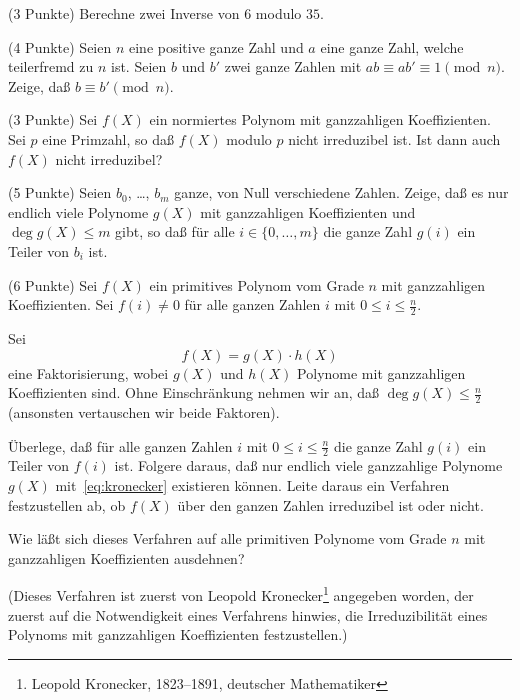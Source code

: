 \documentclass{algsheet}
\begin{document}
\begin{exercise}(3 Punkte)\newline
    Berechne zwei Inverse von \(6\) modulo \(35\).
\end{exercise}

\begin{exercise}(4 Punkte)\newline
    Seien \(n\) eine positive ganze Zahl
    und \(a\) eine ganze Zahl, welche teilerfremd zu
    \(n\) ist. Seien \(b\) und \(b'\) zwei ganze Zahlen mit
    \(a b \equiv a b' \equiv 1 \pmod n\). Zeige, daß
    \(b \equiv b'  \pmod n\).
\end{exercise}

\begin{exercise}(3 Punkte)\newline
    Sei \(f(X)\) ein normiertes Polynom mit ganzzahligen Koeffizienten.
    Sei \(p\) eine Primzahl, so daß \(f(X)\) modulo \(p\) nicht irreduzibel
    ist. Ist dann auch \(f(X)\) nicht irreduzibel?
\end{exercise}

\begin{exercise}(5 Punkte)\newline
    Seien \(b_0\), \dots, \(b_m\) ganze, von Null verschiedene Zahlen. Zeige, daß es nur endlich viele Polynome
    \(g(X)\) mit ganzzahligen Koeffizienten und \(\deg g(X) \leq m\) gibt, so daß für alle
    \(i \in \{0, \dots, m\}\) die ganze Zahl \(g(i)\) ein Teiler von \(b_i\) ist.
\end{exercise}

\begin{exercise}(6 Punkte)\newline
    Sei \(f(X)\) ein primitives Polynom vom Grade \(n\) mit ganzzahligen Koeffizienten. Sei
    \(f(i) \neq 0\) für alle ganzen Zahlen \(i\) mit \(0 \leq i \leq \frac n 2\).
    
    Sei
    \begin{equation}
        f(X) = g(X) \cdot h(X)
        \label{eq:kronecker}
    \end{equation}
    eine Faktorisierung, wobei \(g(X)\) und \(h(X)\) Polynome mit ganzzahligen Koeffizienten sind.
    Ohne Einschränkung nehmen
    wir an, daß \(\deg g(X) \leq \frac n 2\) (ansonsten vertauschen wir beide Faktoren).
    
    Überlege, daß für alle ganzen Zahlen \(i\) mit \(0 \leq i \leq \frac n 2\) die ganze Zahl \(g(i)\)
    ein Teiler von \(f(i)\) ist. Folgere daraus, daß nur endlich viele ganzzahlige Polynome \(g(X)\)
    mit~\eqref{eq:kronecker} existieren können. Leite daraus ein Verfahren festzustellen ab, ob \(f(X)\) über den
    ganzen Zahlen irreduzibel ist oder nicht.
    
    Wie läßt sich dieses Verfahren auf alle primitiven Polynome vom Grade \(n\) mit ganzzahligen Koeffizienten
    ausdehnen?
    
    (Dieses Verfahren ist zuerst von Leopold Kronecker\footnote{Leopold Kronecker, 1823--1891, deutscher
    Mathematiker} angegeben worden, der zuerst auf die Notwendigkeit eines
    Verfahrens hinwies, die Irreduzibilität eines Polynoms mit ganzzahligen Koeffizienten festzustellen.)
\end{exercise}
\end{document}
